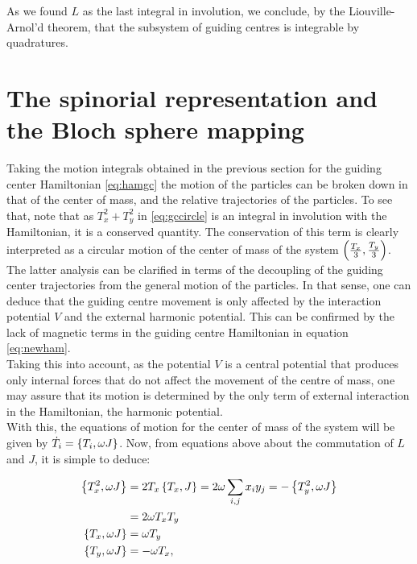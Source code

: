 As we found $L$ as the last integral in involution, we conclude, by the Liouville-Arnol'd theorem, that the subsystem of guiding centres is integrable by quadratures.\\

\section{The spinorial representation and the Bloch sphere mapping}
Taking the motion integrals obtained in the previous section for the guiding center Hamiltonian \eqref{eq:hamgc} the motion of the particles can be broken down in that of the center of mass, and the relative trajectories of the particles. To see that, note that as $T_x^2 + T_y^2$ in \eqref{eq:gccircle} is an integral in involution with the Hamiltonian, it is a conserved quantity. The conservation of this term is clearly interpreted as a circular motion of the center of mass of the system $\left( \frac{T_x}{3},\frac{T_y}{3} \right)$.\\

The latter analysis can be clarified in terms of the decoupling of the guiding center trajectories from the general motion of the particles. In that sense, one can deduce that the guiding centre movement is only affected by the interaction potential $V$ and the external harmonic potential. This can be confirmed by the lack of magnetic terms in the guiding centre Hamiltonian in equation \eqref{eq:newham}.\\

Taking this into account, as the potential $V$ is a central potential that produces only internal forces that do not affect the movement of the centre of mass, one may assure that its motion is determined by the only term of external interaction in the Hamiltonian, the harmonic potential.\\

With this, the equations of motion for the center of mass of the system will be given by $\dot{T}_i = \left\lbrace T_i, {\omega}J \right\rbrace$. Now, from equations above about the commutation of $L$ and $J$, it is simple to deduce:

\begin{align*}
\left\lbrace T_x^2, \omega J \right\rbrace &= 2T_x\left\lbrace T_x, J \right\rbrace = 2\omega\sum_{i,j}x_iy_j = -\left\lbrace T_y^2, \omega J \right\rbrace\\
&= 2\omega T_xT_y \\
\left\lbrace T_x, \omega J \right\rbrace &= \omega T_y\\
\left\lbrace T_y, \omega J \right\rbrace &= -\omega T_x,
\end{align*}

